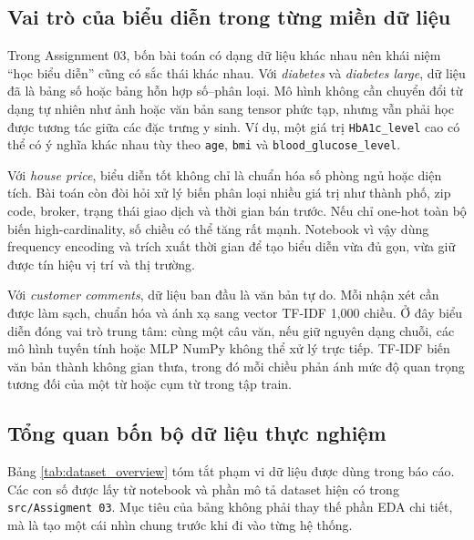 \documentclass[12pt,a4paper]{report}
\newcommand{\modelpath}[1]{\texttt{#1}}
\begin{document}
\subsection{Vai trò của biểu diễn trong từng miền dữ liệu}
Trong Assignment 03, bốn bài toán có dạng dữ liệu khác nhau nên khái niệm ``học biểu diễn'' cũng có sắc thái khác nhau.
Với \textit{diabetes} và \textit{diabetes large}, dữ liệu đã là bảng số hoặc bảng hỗn hợp số--phân loại.
Mô hình không cần chuyển đổi từ dạng tự nhiên như ảnh hoặc văn bản sang tensor phức tạp, nhưng vẫn phải học được tương tác giữa các đặc trưng y sinh.
Ví dụ, một giá trị \texttt{HbA1c\_level} cao có thể có ý nghĩa khác nhau tùy theo \texttt{age}, \texttt{bmi} và \texttt{blood\_glucose\_level}.

Với \textit{house price}, biểu diễn tốt không chỉ là chuẩn hóa số phòng ngủ hoặc diện tích.
Bài toán còn đòi hỏi xử lý biến phân loại nhiều giá trị như thành phố, zip code, broker, trạng thái giao dịch và thời gian bán trước.
Nếu chỉ one-hot toàn bộ biến high-cardinality, số chiều có thể tăng rất mạnh.
Notebook vì vậy dùng frequency encoding và trích xuất thời gian để tạo biểu diễn vừa đủ gọn, vừa giữ được tín hiệu vị trí và thị trường.

Với \textit{customer comments}, dữ liệu ban đầu là văn bản tự do.
Mỗi nhận xét cần được làm sạch, chuẩn hóa và ánh xạ sang vector TF-IDF 1,000 chiều.
Ở đây biểu diễn đóng vai trò trung tâm: cùng một câu văn, nếu giữ nguyên dạng chuỗi, các mô hình tuyến tính hoặc MLP NumPy không thể xử lý trực tiếp.
TF-IDF biến văn bản thành không gian thưa, trong đó mỗi chiều phản ánh mức độ quan trọng tương đối của một từ hoặc cụm từ trong tập train.

\subsection{Tổng quan bốn bộ dữ liệu thực nghiệm}
Bảng \ref{tab:dataset_overview} tóm tắt phạm vi dữ liệu được dùng trong báo cáo.
Các con số được lấy từ notebook và phần mô tả dataset hiện có trong \modelpath{src/Assigment 03}.
Mục tiêu của bảng không phải thay thế phần EDA chi tiết, mà là tạo một cái nhìn chung trước khi đi vào từng hệ thống.
\end{document}
